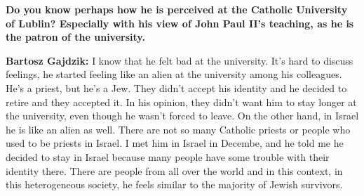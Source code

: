 \textbf{Do you know perhaps how he is perceived at the Catholic University of Lublin? Especially with his view of John Paul II’s teaching, as he is the patron of the university.}  

\textbf{Bartosz Gajdzik:} I know that he felt bad at the university. It’s hard to discuss feelings, he started feeling like an alien at the university among his colleagues. He’s a priest, but he’s a Jew. They didn’t accept his identity and he decided to retire and they accepted it. In his opinion, they didn’t want him to stay longer at the university, even though he wasn’t forced to leave. On the other hand, in Israel he is like an alien as well. There are not so many Catholic priests or people who used to be priests in Israel. I met him in Israel in Decembe, and he told me he decided to stay in Israel because many people have some trouble with their identity there. There are people from all over the world and in this context, in this heterogeneous society, he feels similar to the majority of Jewish survivors.  
